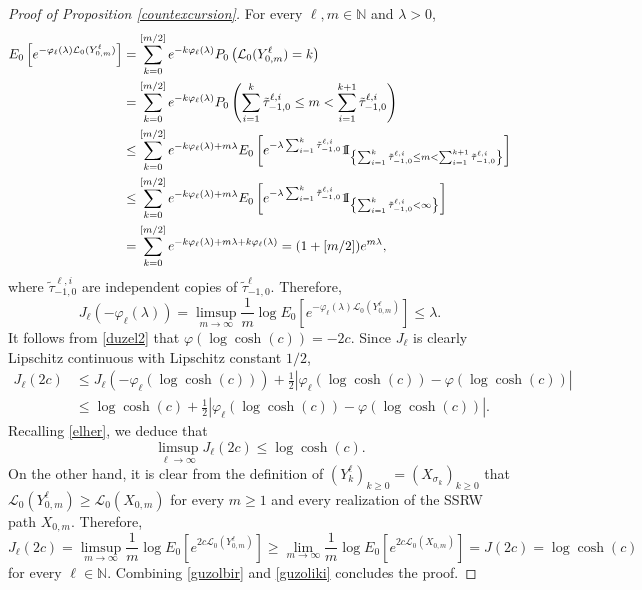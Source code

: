 \documentclass[a4paper]{amsart}
\numberwithin{equation}{section}
\theoremstyle{plain}
\theoremstyle{remark}
\begin{document}
\begin{proof}[Proof of Proposition \ref{countexcursion}]
	For every $\ell,m\in\mathbb{N}$ and $\lambda>0$,	
	\begin{align*}
	E_0\left[e^{-\varphi_\ell(\lambda)\mathcal{L}_0(Y_{0,m}^\ell)}\right] &= \sum_{k=0}^{[m/2]}e^{-k\varphi_\ell(\lambda)}P_0\left(\mathcal{L}_0(Y_{0,m}^\ell) = k\right)\\
	&= \sum_{k=0}^{[m/2]}e^{-k\varphi_\ell(\lambda)}P_0\left(\sum_{i=1}^k \tilde\tau_{-1,0}^{\ell,i} \le m < \sum_{i=1}^{k+1} \tilde\tau_{-1,0}^{\ell,i}\right)\\
	&\le \sum_{k=0}^{[m/2]}e^{-k\varphi_\ell(\lambda) + m\lambda}E_0\left[e^{-\lambda\sum_{i=1}^k \tilde\tau_{-1,0}^{\ell,i}}{{{\rm 1\mkern-1.5mu}\!{\rm I}}}_{\left\{\sum_{i=1}^k \tilde\tau_{-1,0}^{\ell,i} \le m < \sum_{i=1}^{k+1} \tilde\tau_{-1,0}^{\ell,i}\right\}}\right]\\
	&\le \sum_{k=0}^{[m/2]}e^{-k\varphi_\ell(\lambda) + m\lambda}E_0\left[e^{-\lambda\sum_{i=1}^k \tilde\tau_{-1,0}^{\ell,i}}{{{\rm 1\mkern-1.5mu}\!{\rm I}}}_{\left\{\sum_{i=1}^k \tilde\tau_{-1,0}^{\ell,i} < \infty\right\}}\right]\\
	&= \sum_{k=0}^{[m/2]}e^{-k\varphi_\ell(\lambda) + m\lambda + k\varphi_\ell(\lambda)} = (1 + [m/2])e^{m\lambda},
	\end{align*}
	where $\tilde\tau_{-1,0}^{\ell,i}$ are independent copies of $\tilde\tau_{-1,0}^\ell$. Therefore,
	$$J_\ell(-\varphi_\ell(\lambda)) = \limsup_{m\to\infty}\frac1{m}\log E_0\left[e^{-\varphi_\ell(\lambda)\mathcal{L}_0(Y_{0,m}^\ell)}\right] \le \lambda.$$
	It follows from \eqref{duzel2} that $\varphi(\log\cosh(c)) = -2c$. Since $J_\ell$ is clearly Lipschitz continuous with Lipschitz constant $1/2$,
	\begin{align*}
	J_\ell(2c) &\le J_\ell(-\varphi_\ell(\log\cosh(c))) + \frac1{2}|\varphi_\ell(\log\cosh(c)) - \varphi(\log\cosh(c))|\\
	&\le \log\cosh(c) + \frac1{2}|\varphi_\ell(\log\cosh(c)) - \varphi(\log\cosh(c))|.
	\end{align*}
	Recalling \eqref{elher}, we deduce that
	\begin{equation}\label{guzolbir}
	\limsup_{\ell\to\infty}J_\ell(2c) \le \log\cosh(c).
	\end{equation}
	On the other hand, it is clear from the definition of $(Y_k^\ell)_{k\ge0} = (X_{\sigma_k})_{k\ge0}$ that $\mathcal{L}_0(Y_{0,m}^\ell) \ge \mathcal{L}_0(X_{0,m})$ for every $m\ge1$ and every realization of the SSRW path $X_{0,m}$. Therefore,
	\begin{equation}\label{guzoliki}
	J_\ell(2c) = \limsup_{m\to\infty}\frac1{m}\log E_0\left[e^{2c\mathcal{L}_0(Y_{0,m}^\ell)}\right] \ge \lim_{m\to\infty}\frac1{m}\log E_0\left[e^{2c\mathcal{L}_0(X_{0,m})}\right] = J(2c) = \log\cosh(c)
	\end{equation}
	for every $\ell\in\mathbb{N}$. Combining \eqref{guzolbir} and \eqref{guzoliki} concludes the proof.
\end{proof}



\end{document}
